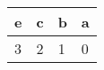 \documentclass{article}[12pt]
\begin{document}
\centering
\begin{tabular}{llll}
e&c&b&a\\
\hline
3&2&1&0
\end{tabular}

  
\end{document}
